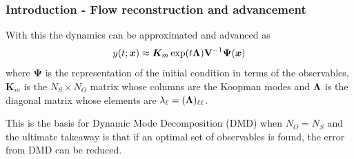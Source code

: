 \documentclass[11pt,aspectratio=169]{beamer}
\newcommand{\bracks}[1]{\left\{#1\right\}}
\begin{document}
    \begin{frame}
        \frametitle{Introduction - Flow reconstruction and advancement}
        With this the dynamics can be approximated and advanced as 
        \begin{equation}
            y(t;\boldsymbol{x}) \approx \boldsymbol{K}_m\exp(t{\bf\Lambda}){\bf V}^{-1}\boldsymbol{\Psi}(\boldsymbol{x}) 
        \end{equation}
        where $\boldsymbol{\Psi}$ is the representation of the initial condition in terms of the observables, 
        $\boldsymbol{K}_m$ is the $N_S \times N_O$ matrix whose columns are the Koopman modes 
        and ${\bf \Lambda}$ is the diagonal matrix whose elements are $\lambda_\ell
        = ({\bf \Lambda})_{\ell\ell}$.
        
        \vspace{1cm}

        This is the basis for Dynamic Mode Decomposition (DMD) when $N_O = N_S$ 
        and the ultimate takeaway is that if an optimal set of observables is found, 
        the error from DMD can be reduced.
    \end{frame}

\end{document}
